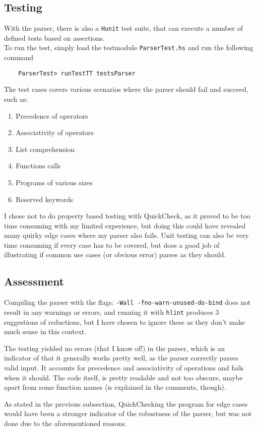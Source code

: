 \documentclass[a4paper]{article}
\begin{document}
\subsection{Testing}
\label{sub:Testing_p}
With the parser, there is also a \texttt{Hunit} test suite, that can execute a number of defined tests based on assertions.\\
To run the test, simply load the testmodule \texttt{ParserTest.hs} and run the following command
\begin{verbatim}
    ParserTest> runTestTT testsParser
\end{verbatim}
The test cases covers various scenarios where the parser should fail and succeed, such as:
\begin{enumerate}
  \item Precedence of operators
  \item Associativity of operators
  \item List comprehension
  \item Functions calls
  \item Programs of various sizes
  \item Reserved keywords
\end{enumerate}
I chose not to do property based testing with QuickCheck, as it proved to be too time consuming with my limited experience, but doing this could have revealed many quirky edge cases where my parser also fails. Unit testing can also be very time consuming if every case has to be covered, but does a good job of illustrating if common use cases (or obvious error) parses as they should.
\subsection{Assessment}
\label{sub:Assessment_p}
Compiling the parser with the flags: \texttt{-Wall -fno-warn-unused-do-bind} does not result in any warnings or errors, and running it with \texttt{hlint} produces 3 suggestions of reductions, but I have chosen to ignore these as they don't make much sense in this context.

The testing yielded no errors (that I know of!) in the parser, which is an indicator of that it generally works pretty well, as the parser correctly parses valid input. It accounts for precedence and associativity of operations and fails when it should. The code itself, is pretty readable and not too obscure, maybe apart from some function names (is explained in the comments, though).

As stated in the previous subsection, QuickChecking the program for edge cases would have been a stronger indicator of the robustness of the parser, but was not done due to the aforementioned reasons.
\end{document}
